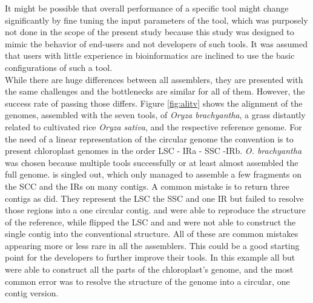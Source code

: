 It might be possible that overall performance of a specific tool might change
significantly by fine tuning the input parameters of the tool, which was purposely not
done in the scope of the present study because this study was designed to mimic the
behavior of end-users and not developers of such tools. It was assumed that
users with little experience in bioinformatics are inclined to use the basic configurations of such a tool. \\

While there are huge differences between all assemblers, they are presented with the same
challenges and the bottlenecks are similar for all of them. However, the success rate of
passing those differs. Figure \ref{fig:alitv} shows the alignment of the genomes,
assembled with the seven tools, of \textit{Oryza brachyantha}, a grass distantly related
to cultivated rice \textit{Oryza sativa}, and the respective reference genome. For the
need of a linear representation of the circular genome the convention is to present
chloroplast genomes in the order LSC - IRa - SSC -IRb. \textit{O. brachyantha} was chosen
because multiple tools successfully or at least almost assembled the full genome.  \cassp
\hspace{0.25ex} is singled out, which only managed to assemble a few fragments on the SCC
and the IRs on many contigs. A common mistake is to return three contigs as \ioga
\hspace{0.25ex} did. They represent the LSC the SSC and one IR but failed to resolve those
regions into a one circular contig. \go \hspace{0.25ex} and \fp \hspace{0.25ex} were able
to reproduce the structure of the reference, while \ce \hspace{0.25ex} flipped the LSC and
\np \hspace{0.25ex} and \oa \hspace{0.25ex} were not able to construct the single contig
into the conventional structure. All of these are common mistakes appearing more or less
rare in all the assemblers. This could be a good starting point for the developers to
further improve their tools. In this example all but \cassp \hspace{0.25ex} were able to
construct all the parts of the chloroplast's genome, and the most common error was to
resolve the structure of the genome into a circular, one contig version.

